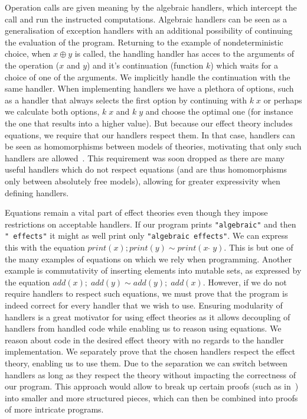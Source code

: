 \documentclass{article}
\begin{document}
Operation calls are given meaning by the algebraic handlers, which intercept the call and run the instructed computations. Algebraic handlers can be seen as a generalisation of exception handlers with an additional possibility of continuing the evaluation of the program. Returning to the example of nondeterministic choice, when $x \oplus y$ is called, the handling handler has acces to the arguments of the operation ($x$ and $y$) and it's continuation (function $k$) which waits for a choice of one of the arguments. We implicitly handle the continuation with the same handler. When implementing handlers we have a plethora of options, such as a handler that always selects the first option by continuing with $k \; x$ or perhaps we calculate both options, $k \; x$ and $k \; y$ and choose the optimal one (for instance the one that results into a higher value). But because our effect theory includes equations, we require that our handlers respect them. In that case, handlers can be seen as homomorphisms between models of theories, motivating that only such handlers are allowed~\cite{DBLP:conf/esop/PlotkinP09}. This requirement was soon dropped as there are many useful handlers which do not respect equations (and are thus homomorphisms only between absolutely free models), allowing for greater expressivity when defining handlers.

Equations remain a vital part of effect theories even though they impose restrictions on acceptable handlers. If our program prints \texttt{"algebraic"} and then \texttt{" effects"} it might as well print only \texttt{"algebraic effects"}. We can express this with the equation $print(x); print(y) \sim print(x\;\hat{}\;y)$. This is but one of the many examples of equations on which we rely when programming. Another example is commutativity of inserting elements into mutable sets, as expressed by the equation $add(x);\; add(y) \sim add(y);\; add(x)$. However, if we do not require handlers to respect such equations, we must prove that the program is indeed correct for every handler that we wish to use. Ensuring modularity of handlers is a great motivator for using effect theories as it allows decoupling of handlers from handled code while enabling us to reason using equations. We reason about code in the desired effect theory with no regards to the handler implementation. We separately prove that the chosen handlers respect the effect theory, enabling us to use them. Due to the separation we can switch between handlers as long as they respect the theory without impacting the correctness of our program. This approach would allow to break up certain proofs (such as in~\cite{DBLP:journals/jlp/BauerP15}) into smaller and more structured pieces, which can then be combined into proofs of more intricate programs.
\end{document}
